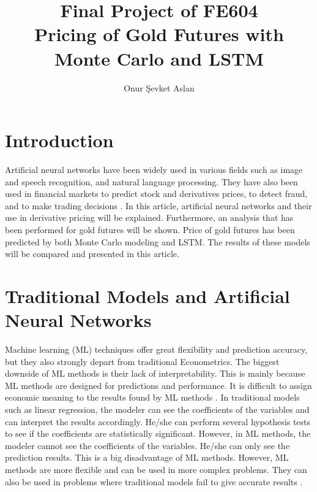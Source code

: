 \documentclass[12pt, a4paper]{article}
\title{Final Project of FE604 \\ Pricing of Gold Futures with Monte Carlo and LSTM}
\author{Onur Şevket Aslan}
\begin{document}
\maketitle

\newpage
\tableofcontents

\newpage
\section{Introduction}
Artificial neural networks have been widely used in various fields such as image and speech recognition, and natural language processing.  They have also been used in financial markets to predict stock and derivatives prices, to detect fraud, and to make trading decisions \cite{4}.  In this article, artificial neural networks and their use in derivative pricing will be explained.  Furthermore, an analysis that has been performed for gold futures will be shown.  Price of gold futures has been predicted by both Monte Carlo modeling and LSTM.  The results of these models will be compared and presented in this article.\\[\baselineskip]


\section{Traditional Models and Artificial Neural Networks}
Machine learning (ML) techniques offer great flexibility and prediction accuracy, but they also strongly depart from traditional Econometrics.  The biggest downside of ML methods is their lack of interpretability.  This is mainly because ML methods are designed for predictions and performance.  It is difficult to assign economic meaning to the results found by ML methods \cite{3}.  In traditional models such as linear regression, the modeler can see the coefficients of the variables and can interpret the results accordingly.  He/she can perform several hypothesis tests to see if the coefficients are statistically significant.  However, in ML methods, the modeler cannot see the coefficients of the variables.  He/she can only see the prediction results.  This is a big disadvantage of ML methods.  However, ML methods are more flexible and can be used in more complex problems.  They can also be used in problems where traditional models fail to give accurate results \cite{3}.\\
\end{document}
